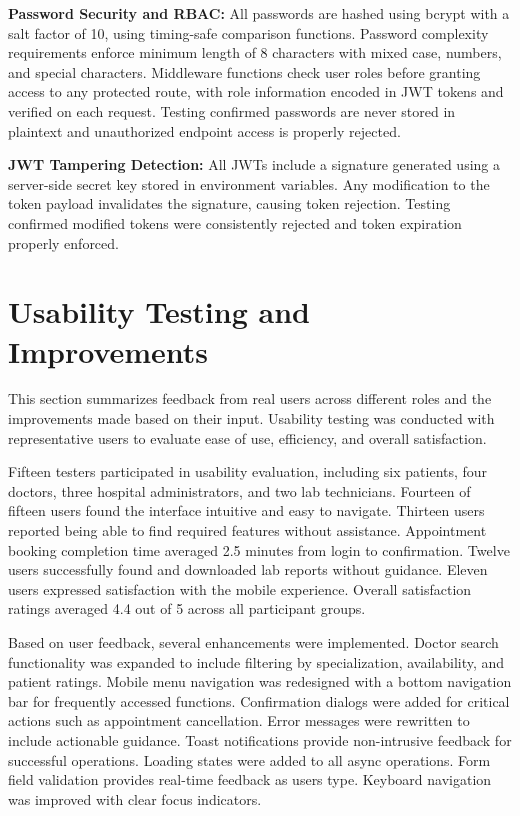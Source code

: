 \justifying
\noindent \textbf{Password Security and RBAC:} All passwords are hashed using bcrypt with a salt factor of 10, using timing-safe comparison functions. Password complexity requirements enforce minimum length of 8 characters with mixed case, numbers, and special characters. Middleware functions check user roles before granting access to any protected route, with role information encoded in JWT tokens and verified on each request. Testing confirmed passwords are never stored in plaintext and unauthorized endpoint access is properly rejected.

\justifying
\noindent \textbf{JWT Tampering Detection:} All JWTs include a signature generated using a server-side secret key stored in environment variables. Any modification to the token payload invalidates the signature, causing token rejection. Testing confirmed modified tokens were consistently rejected and token expiration properly enforced.

\section{Usability Testing and Improvements}

\justifying
\noindent This section summarizes feedback from real users across different roles and the improvements made based on their input. Usability testing was conducted with representative users to evaluate ease of use, efficiency, and overall satisfaction.

\justifying
\noindent Fifteen testers participated in usability evaluation, including six patients, four doctors, three hospital administrators, and two lab technicians. Fourteen of fifteen users found the interface intuitive and easy to navigate. Thirteen users reported being able to find required features without assistance. Appointment booking completion time averaged 2.5 minutes from login to confirmation. Twelve users successfully found and downloaded lab reports without guidance. Eleven users expressed satisfaction with the mobile experience. Overall satisfaction ratings averaged 4.4 out of 5 across all participant groups.

\justifying
\noindent Based on user feedback, several enhancements were implemented. Doctor search functionality was expanded to include filtering by specialization, availability, and patient ratings. Mobile menu navigation was redesigned with a bottom navigation bar for frequently accessed functions. Confirmation dialogs were added for critical actions such as appointment cancellation. Error messages were rewritten to include actionable guidance. Toast notifications provide non-intrusive feedback for successful operations. Loading states were added to all async operations. Form field validation provides real-time feedback as users type. Keyboard navigation was improved with clear focus indicators.

